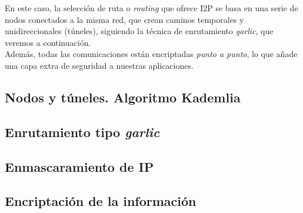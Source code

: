 En este caso, la selección de ruta o \textit{routing} que ofrece I2P se basa en una serie de nodos conectados a la misma red, que crean caminos temporales y unidireccionales (túneles), siguiendo la técnica de enrutamiento \textit{garlic}, que veremos a continuación.\\

Además, todas las comunicaciones están encriptadas \textit{punto a punto}, lo que añade una capa extra de seguridad a nuestras aplicaciones.

\subsection{Nodos y túneles. Algoritmo Kademlia}






\subsection{Enrutamiento tipo \textit{garlic}}

\subsection{Enmascaramiento de IP}

\subsection{Encriptación de la información}

